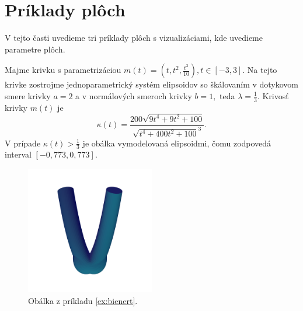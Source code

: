 \section{Príklady plôch}
V tejto časti uvedieme tri príklady plôch s vizualizáciami, kde uvedieme parametre plôch.
\begin{example}[Bienert]
\label{ex:bienert}
Majme krivku s parametrizáciou $m(t)=(t, t^2, \frac{t^3}{10}), t \in [-3,3].$  Na tejto krivke zostrojme jednoparametrický systém elipsoidov so škálovaním v dotykovom smere krivky $a = 2$ a v normálových smeroch krivky $b = 1,$ teda $\lambda = \frac{1}{3}.$
Krivosť krivky $m(t)$ je
$$
\kappa(t) = \frac{200 \sqrt{9 t^{4} + 9 t^{2} + 100}}{\sqrt{ t^{4} + 400 t^{2} + 100}^3}.
$$
V prípade $\kappa(t) > \frac{1}{3}$ je obálka vymodelovaná elipsoidmi, čomu zodpovedá interval $ [-0,773, 0,773]. $ 
\begin{figure}[h]
	\centering
	\includegraphics[width=0.5\textwidth]{images/bienert_ellipsoids_envelope.png}
	\caption[Obálka z príkladu \ref{ex:bienert}.]{Obálka z príkladu \ref{ex:bienert}.}
\end{figure}
\end{example}
